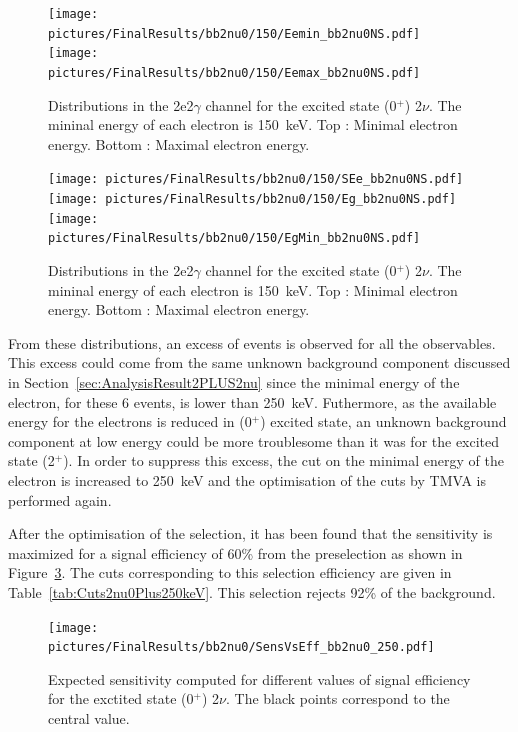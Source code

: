 \documentclass[main.tex]{subfiles}
\begin{document}
\begin{figure} [h!]
\begin{center}
\texttt{[image: pictures/FinalResults/bb2nu0/150/Eemin\_bb2nu0NS.pdf]}
\texttt{[image: pictures/FinalResults/bb2nu0/150/Eemax\_bb2nu0NS.pdf]}
\end{center}
\caption{Distributions in the 2e2$\gamma$ channel for the excited state (0$^+$) 2$\nu$. The mininal energy of each electron is 150~keV. Top : Minimal electron energy. Bottom : Maximal electron energy.}
\label{plot:EeminAndEemax250bb2nu0_150}
\end{figure}


\begin{figure} [h!]
\begin{center}
\texttt{[image: pictures/FinalResults/bb2nu0/150/SEe\_bb2nu0NS.pdf]}
\texttt{[image: pictures/FinalResults/bb2nu0/150/Eg\_bb2nu0NS.pdf]}
\texttt{[image: pictures/FinalResults/bb2nu0/150/EgMin\_bb2nu0NS.pdf]}
\end{center}
\caption{Distributions in the 2e2$\gamma$ channel for the excited state (0$^+$) 2$\nu$. The mininal energy of each electron is 150~keV. Top : Minimal electron energy. Bottom : Maximal electron energy.}
\label{plot:SEeAndEg250bb2nu0_150}
\end{figure}


\NI From these distributions, an excess of events is observed for all the observables. This excess could come from the same unknown background component discussed in Section~\ref{sec:AnalysisResult2PLUS2nu} since the minimal energy of the electron, for these 6 events, is lower than 250~keV. Futhermore, as the available energy for the electrons is reduced in (0$^+$) excited state, an unknown background component at low energy could be more troublesome than it was for the excited state (2$^+$). In order to suppress this excess, the cut on the minimal energy of the electron is increased to 250~keV and the optimisation of the cuts by TMVA is performed again.


\bigskip


\NI After the optimisation of the selection, it has been found that the sensitivity is maximized for a signal efficiency of 60\% from the preselection as shown in Figure~\ref{plot:SensVsEffbb2nu0_250}. The cuts corresponding to this selection efficiency are given in Table~\ref{tab:Cuts2nu0Plus250keV}. This selection rejects 92\% of the background.


\begin{figure} [h!]
\begin{center}
\texttt{[image: pictures/FinalResults/bb2nu0/SensVsEff\_bb2nu0\_250.pdf]}
\end{center}
\caption{Expected sensitivity computed for different values of signal efficiency for the exctited state (0$^+$) 2$\nu$. The black points correspond to the central value.}
\label{plot:SensVsEffbb2nu0_250}
\end{figure}
\end{document}
